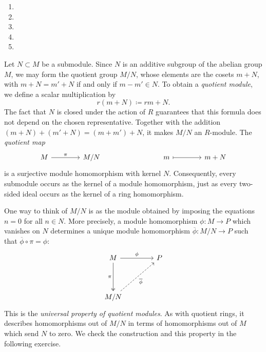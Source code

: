 \documentclass[Notebook.tex]{subfiles}
\begin{document}
\begin{solution}
	\bbni
	\begin{enumerate}[label=(\alph*),ref=\theenumi\alph*]
		\item
		\item
		\item
		\item
		\item
	\end{enumerate}
\end{solution}

\newpage

Let $N\subset M$ be a submodule. Since $N$ is an additive subgroup of the abelian group $M$, we may form the quotient group $M/N$, whose elements are the cosets $m+N$, with $m+N=m'+N$ if and only if $m-m'\in N$. To obtain a \emph{quotient module}, we define a scalar multiplication by
\[
r(m+N)\coloneqq rm+N.
\]
The fact that $N$ is closed under the action of $R$ guarantees that this formula does not depend on the chosen representative. Together with the addition $(m+N)+(m'+N)=(m+m')+N$, it makes $M/N$ an $R$-module. The \emph{quotient map}
\[
\begin{tikzcd}[row sep=.3em,column sep=4em]
	M \arrow[r,"\pi"] & M/N & & m \arrow[r,mapsto] & m+N
\end{tikzcd}
\]
is a surjective module homomorphism with kernel $N$. Consequently, every submodule occurs as the kernel of a module homomorphism, just as every two-sided ideal occurs as the kernel of a ring homomorphism.

One way to think of $M/N$ is as the module obtained by imposing the equations $n=0$ for all $n\in N$. More precisely, a module homomorphism $\phi:M\to P$ which vanishes on $N$ determines a unique module homomorphism $\overline{\phi}:M/N\to P$ such that $\overline{\phi}\circ \pi=\phi$:
\[
\begin{tikzcd}[column sep=4em,row sep=4em]
	M \arrow[r,"\phi"] \arrow[d,two heads,"\pi"'] & P \\
	M/N \arrow[ur,dashed,"\overline{\phi}"'] &
\end{tikzcd}
\]
This is the \emph{universal property of quotient modules}. As with quotient rings, it describes homomorphisms out of $M/N$ in terms of homomorphisms out of $M$ which send $N$ to zero. We check the construction and this property in the following exercise.

\hrulefill
\end{document}
